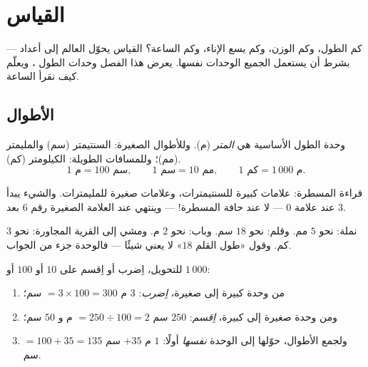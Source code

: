 \chapter{القياس}\label{ch:g3:measure}

كم الطول، وكم الوزن، وكم يسع الإناء، وكم الساعة؟ القياس يحوّل
العالم إلى أعداد --- بشرط أن يستعمل الجميع الوحدات نفسها. يعرض
هذا الفصل وحدات الطول  ، ويعلّم كيف نقرأ
الساعة.

\section{الأطوال}

\begin{definition}\label{def:g3:measure:length}
وحدة الطول الأساسية هي \emph{المتر} (م). وللأطوال الصغيرة:
السنتيمتر (سم) والمليمتر (مم)؛ وللمسافات الطويلة:
الكيلومتر (كم).
\[
1 \text{ م} = 100 \text{ سم}, \qquad
1 \text{ سم} = 10 \text{ مم}, \qquad
1 \text{ كم} = 1\,000 \text{ م}.
\]
\end{definition}

\begin{omfigure}

{\small قراءة المسطرة: علامات كبيرة للسنتيمترات، وعلامات صغيرة
للمليمترات. والشيء يبدأ عند علامة $0$ --- لا عند حافة
المسطرة! --- وينتهي عند العلامة الصغيرة رقم $6$ بعد $3$.}
\end{omfigure}

\begin{example}\label{ex:g3:measure:choose}
نملة: نحو $5$ مم. وقلم: نحو $18$ سم. وباب: نحو $2$ م.
ومشي إلى القرية المجاورة: نحو $3$ كم. وقول «طول القلم
$18$» لا يعني شيئًا --- فالوحدة جزء من الجواب.
\end{example}

\begin{method}\label{met:g3:measure:convert}
للتحويل، اِضرب أو اِقسم على $10$ أو $100$ أو $1\,000$:
\begin{enumerate}
  \item من وحدة كبيرة إلى صغيرة، \emph{اِضرب}:
        $3$ م $= 3 \times 100 = 300$ سم؛
  \item ومن وحدة صغيرة إلى كبيرة، \emph{اِقسم}:
        $250$ سم $= 250 \div 100 = 2$ م و $50$ سم؛
  \item ولجمع الأطوال، حوّلها إلى الوحدة \emph{نفسها} أولًا:
        $1$ م $+ 35$ سم $= 100 + 35 = 135$ سم.
\end{enumerate}
\end{method}

